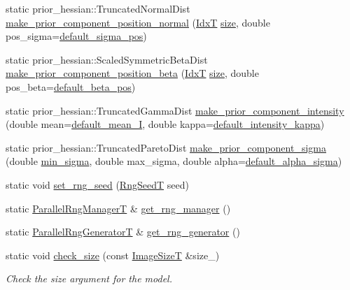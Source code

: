 \begin{DoxyCompactItemize}
\item 
static prior\+\_\+hessian\+::\+Truncated\+Normal\+Dist \hyperlink{classmappel_1_1PointEmitterModel_ab99350cf74097c558f7a93b79e7a44c3}{make\+\_\+prior\+\_\+component\+\_\+position\+\_\+normal} (\hyperlink{namespacemappel_ab17ec0f30b61ece292439d7ece81d3a8}{IdxT} \hyperlink{classmappel_1_1ImageFormat2DBase_a3be77d2aa6ec9f3815322732950c2a60}{size}, double pos\+\_\+sigma=\hyperlink{classmappel_1_1PointEmitterModel_aa98a73b9e3937c00b07596d3928df3ca}{default\+\_\+sigma\+\_\+pos})
\item 
static prior\+\_\+hessian\+::\+Scaled\+Symmetric\+Beta\+Dist \hyperlink{classmappel_1_1PointEmitterModel_ad4d563dd11df8c3daf83890374807185}{make\+\_\+prior\+\_\+component\+\_\+position\+\_\+beta} (\hyperlink{namespacemappel_ab17ec0f30b61ece292439d7ece81d3a8}{IdxT} \hyperlink{classmappel_1_1ImageFormat2DBase_a3be77d2aa6ec9f3815322732950c2a60}{size}, double pos\+\_\+beta=\hyperlink{classmappel_1_1PointEmitterModel_a9b64c3b4b97ac2805340c0779c71398c}{default\+\_\+beta\+\_\+pos})
\item 
static prior\+\_\+hessian\+::\+Truncated\+Gamma\+Dist \hyperlink{classmappel_1_1PointEmitterModel_a4517e887a22007bd2e03650dcb853c92}{make\+\_\+prior\+\_\+component\+\_\+intensity} (double mean=\hyperlink{classmappel_1_1PointEmitterModel_a575dd30a0afb886db82ac725c8cc8df3}{default\+\_\+mean\+\_\+I}, double kappa=\hyperlink{classmappel_1_1PointEmitterModel_ad1f21ed3be543deed3c78a0494cb2984}{default\+\_\+intensity\+\_\+kappa})
\item 
static prior\+\_\+hessian\+::\+Truncated\+Pareto\+Dist \hyperlink{classmappel_1_1PointEmitterModel_a6fa9641db2d58329c5225e76427e3219}{make\+\_\+prior\+\_\+component\+\_\+sigma} (double \hyperlink{classmappel_1_1Gauss2DsModel_a8a97d37d210c1d161e4bc32c3a7b20dc}{min\+\_\+sigma}, double max\+\_\+sigma, double alpha=\hyperlink{classmappel_1_1PointEmitterModel_a0d9f2c5438940f329e75708987e8b343}{default\+\_\+alpha\+\_\+sigma})
\item 
static void \hyperlink{classmappel_1_1PointEmitterModel_a046d5bd901c8dfde61f082c2634beec0}{set\+\_\+rng\+\_\+seed} (\hyperlink{namespacemappel_a318bca259a7add5979160939a3f4e60b}{Rng\+SeedT} seed)
\item 
static \hyperlink{namespacemappel_acf276a4212f07b1ed4cb2ddce379ba1d}{Parallel\+Rng\+ManagerT} \& \hyperlink{classmappel_1_1PointEmitterModel_ae876f0fa81613161a064452973bfb558}{get\+\_\+rng\+\_\+manager} ()
\item 
static \hyperlink{namespacemappel_ad1e99b214465229065d30f881a89d1cc}{Parallel\+Rng\+GeneratorT} \& \hyperlink{classmappel_1_1PointEmitterModel_af9f6630e9d496bb83e151f00522ecc2d}{get\+\_\+rng\+\_\+generator} ()
\item 
static void \hyperlink{classmappel_1_1ImageFormat2DBase_a9c90f6a165348629be4bcf956e3010f3}{check\+\_\+size} (const \hyperlink{classmappel_1_1ImageFormat2DBase_a49cccf61eb2a768a202634d27fcd81d5}{Image\+SizeT} \&size\+\_\+)
\begin{DoxyCompactList}\small\item\em Check the size argument for the model. \end{DoxyCompactList}\end{DoxyCompactItemize}
